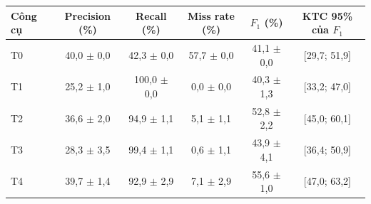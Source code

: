 \begin{tabular}{lccccc}
\toprule
\textbf{Công cụ} & \textbf{Precision (\%)} & \textbf{Recall (\%)} & \textbf{Miss rate (\%)} & \textbf{$F_1$ (\%)} & \textbf{KTC 95\% của $F_1$} \\
\midrule
T0 & 40{,}0 $\pm$ 0{,}0 & 42{,}3 $\pm$ 0{,}0 & 57{,}7 $\pm$ 0{,}0 & 41{,}1 $\pm$ 0{,}0 & [29{,}7; 51{,}9] \\
T1 & 25{,}2 $\pm$ 1{,}0 & 100{,}0 $\pm$ 0{,}0 & 0{,}0 $\pm$ 0{,}0 & 40{,}3 $\pm$ 1{,}3 & [33{,}2; 47{,}0] \\
T2 & 36{,}6 $\pm$ 2{,}0 & 94{,}9 $\pm$ 1{,}1 & 5{,}1 $\pm$ 1{,}1 & 52{,}8 $\pm$ 2{,}2 & [45{,}0; 60{,}1] \\
T3 & 28{,}3 $\pm$ 3{,}5 & 99{,}4 $\pm$ 1{,}1 & 0{,}6 $\pm$ 1{,}1 & 43{,}9 $\pm$ 4{,}1 & [36{,}4; 50{,}9] \\
T4 & 39{,}7 $\pm$ 1{,}4 & 92{,}9 $\pm$ 2{,}9 & 7{,}1 $\pm$ 2{,}9 & 55{,}6 $\pm$ 1{,}0 & [47{,}0; 63{,}2] \\
\bottomrule
\end{tabular}

